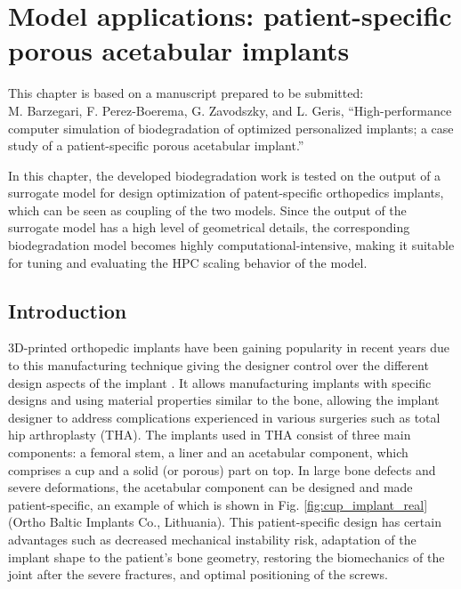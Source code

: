 \chapter{Model applications: patient-specific porous acetabular implants}\label{ch:cup}

\begin{shaded}
This chapter is based on a manuscript prepared to be submitted:\\
M. Barzegari, F. Perez-Boerema, G. Zavodszky, and L. Geris, ``High-performance computer simulation of biodegradation of optimized personalized implants; a case study of a patient-specific porous acetabular implant.''
\end{shaded}

In this chapter, the developed biodegradation work is tested on the output of a surrogate model for design optimization of patent-specific orthopedics implants, which can be seen as coupling of the two models. Since the output of the surrogate model has a high level of geometrical details, the corresponding biodegradation model becomes highly computational-intensive, making it suitable for tuning and evaluating the HPC scaling behavior of the model.

\section{Introduction}


3D-printed orthopedic implants have been gaining popularity in recent years due to this manufacturing technique giving the designer control over the different design aspects of the implant \cite{Kumar2021,Yadav2020}. It allows manufacturing implants with specific designs and using material properties similar to the bone, allowing the implant designer to address complications experienced in various surgeries such as total hip arthroplasty (\gls{THA}). The implants used in \gls{THA} consist of three main components: a femoral stem, a liner and an acetabular component, which comprises a cup and a solid (or porous) part on top. In large bone defects and severe deformations, the acetabular component can be designed and made patient-specific, an example of which is shown in Fig. \ref{fig:cup_implant_real} (Ortho Baltic Implants Co., Lithuania). This patient-specific design has certain advantages such as decreased mechanical instability risk, adaptation of the implant shape to the patient's bone geometry, restoring the biomechanics of the joint after the severe fractures, and optimal positioning of the screws.

